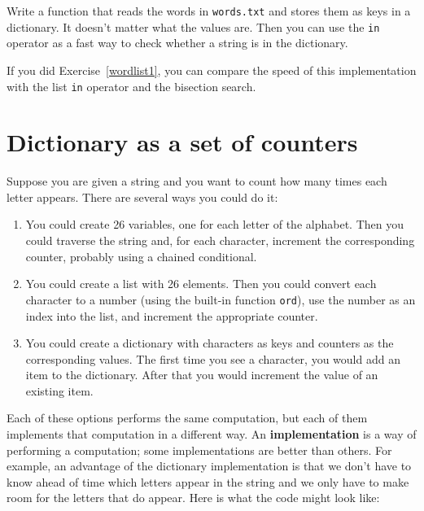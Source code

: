 
\begin{exercise}
\label{wordlist2}


Write a function that reads the words in {\tt words.txt} and
stores them as keys in a dictionary.  It doesn't matter what the
values are.  Then you can use the {\tt in} operator
as a fast way to check whether a string is in
the dictionary.

If you did {\color{red} Exercise~\ref{wordlist1}}, you can compare the speed
of this implementation with the list {\tt in} operator and the
bisection search.

\end{exercise}


\section{Dictionary as a set of counters}
\label{histogram}


Suppose you are given a string and you want to count how many
times each letter appears.  There are several ways you could do it:

\begin{enumerate}

\item You could create 26 variables, one for each letter of the
alphabet.  Then you could traverse the string and, for each
character, increment the corresponding counter, probably using
a chained conditional.

\item You could create a list with 26 elements.  Then you could
convert each character to a number (using the built-in function
{\tt ord}), use the number as an index into the list, and increment
the appropriate counter.

\item You could create a dictionary with characters as keys
and counters as the corresponding values.  The first time you
see a character, you would add an item to the dictionary.  After
that you would increment the value of an existing item.

\end{enumerate}

Each of these options performs the same computation, but each
of them implements that computation in a different way.
%
%
An {\bf implementation} is a way of performing a computation;
some implementations are better than others.  For example,
an advantage of the dictionary implementation is that we don't
have to know ahead of time which letters appear in the string
and we only have to make room for the letters that do appear.
%
Here is what the code might look like:

